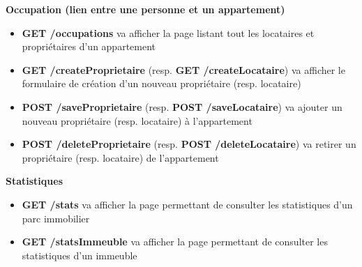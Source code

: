 \documentclass[french]{article}
\begin{document}
\noindent \textbf{Occupation (lien entre une personne et un appartement)}
\begin{itemize}
\item \textbf{GET /occupations} va afficher la page listant tout les locataires et propriétaires d'un appartement
\item \textbf{GET /createProprietaire} (resp. \textbf{GET /createLocataire}) va afficher le formulaire de création d'un nouveau propriétaire (resp. locataire)
\item \textbf{POST /saveProprietaire} (resp. \textbf{POST /saveLocataire}) va ajouter un nouveau propriétaire (resp. locataire) à l'appartement
\item \textbf{POST /deleteProprietaire} (resp. \textbf{POST /deleteLocataire}) va retirer un propriétaire (resp. locataire) de l'appartement \\
\end{itemize}

\noindent \textbf{Statistiques}
\begin{itemize}
\item \textbf{GET /stats} va afficher la page permettant de consulter les statistiques d'un parc immobilier
\item \textbf{GET /statsImmeuble} va afficher la page permettant de consulter les statistiques d'un immeuble \\
\end{itemize}
\end{document}
